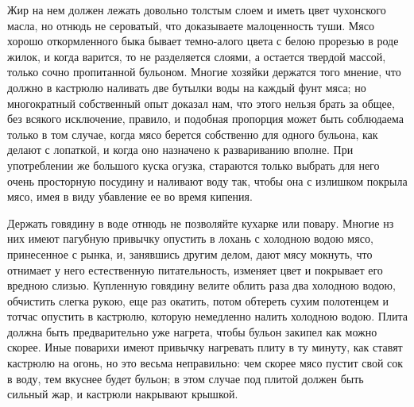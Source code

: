 Жир на нем должен лежать довольно толстым слоем и иметь цвет чухонского масла, но отнюдь не сероватый, что доказываете малоценность туши. Мясо хорошо откормленного быка бывает темно-алого цвета с белою прорезью в роде жилок, и когда варится, то не разделяется слоями, а остается твердой массой, только сочно пропитанной бульоном. Многие хозяйки держатся того мнение, что должно в кастрюлю наливать две бутылки воды на каждый фунт мяса; но многократный собственный опыт доказал нам, что этого нельзя брать за общее, без всякого исключение, правило, и подобная пропорция может быть соблюдаема только в том случае, когда мясо берется собственно для одного бульона, как делают с лопаткой, и когда оно назначено к развариванию вполне. При употреблении же большого куска огузка, стараются только выбрать для него очень просторную посудину и наливают воду так, чтобы она с излишком покрыла мясо, имея в виду убавление ее во время кипения.

Держать говядину в воде отнюдь не позволяйте кухарке или повару. Многие нз них имеют пагубную привычку опустить в лохань с холодною водою мясо, принесенное с рынка, и, занявшись другим делом, дают мясу мокнуть, что отнимает у него естественную питательность, изменяет цвет и покрывает его вредною слизью. Купленную говядину велите облить раза два холодною водою, обчистить слегка рукою, еще раз окатить, потом обтереть сухим полотенцем и тотчас опустить в кастрюлю, которую немедленно налить холодною водою. Плита должна быть предварительно уже нагрета, чтобы бульон закипел как можно скорее. Иные поварихи имеют привычку нагревать плиту в ту минуту, как ставят кастрюлю на огонь, но это весьма неправильно: чем скорее мясо пустит свой сок в воду, тем вкуснее будет бульон; в этом случае под плитой должен быть сильный жар, и кастрюли накрывают крышкой.


